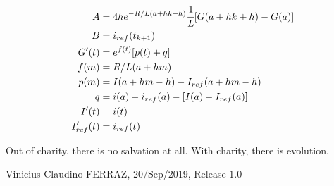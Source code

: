 \documentclass[10pt]{article}
\begin{document}
\begin{align}
  A &= 4h e^{-R/L (a + hk + h)}\cfrac{1}{L} [G(a + hk + h) - G(a)] \\
  B &= i_{ref}(t_{k+1}) \\
  G'(t) &= e^{f(t)} [p(t) + q] \\
  f(m) &= R/L (a + hm) \\
  p(m) &= I(a + hm - h) - I_{ref}(a + hm - h) \\
  q &= i(a) - i_{ref}(a) - [I(a) - I_{ref}(a)] \\
  I'(t) &= i(t) \\
  I_{ref}'(t) &= i_{ref}(t)
\end{align}

\vspace{3mm}

Out of charity, there is no salvation at all. With charity, there is evolution.

\vspace{3mm}

Vinicius Claudino FERRAZ, 20/Sep/2019, Release $1.0$
\end{document}
